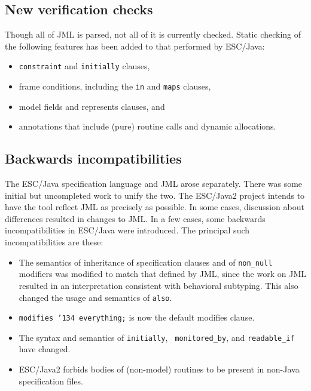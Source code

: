 \documentclass{acm_proc_article-sp}
\begin{document}
\subsection{New verification checks}
Though all of JML is parsed, not all of it is currently checked.
Static checking of the following features has been added to that performed by
ESC/Java: 
\setlength{\partopsep}{0in}\setlength{\parskip}{0in}\setlength{\itemsep}{0in}\setlength{\topsep}{0in}
\begin{itemize}
\setlength{\partopsep}{0in}\setlength{\parskip}{0in}\setlength{\itemsep}{0in}\setlength{\topsep}{0in}
\item \texttt{constraint} and \texttt{initially} clauses,
\item frame conditions, including the \texttt{in} and \texttt{maps} clauses,
\item model fields and represents clauses, and
\item annotations that include (pure) routine calls and dynamic allocations.
\end{itemize}

\subsection{Backwards incompatibilities}
The ESC/Java specification language and JML arose separately.  There
was some initial but uncompleted work to unify the two.  The ESC/Java2
project intends to have the tool reflect JML as precisely as possible.
In some cases, discussion about differences resulted in changes to JML.  In
a few cases, some backwards incompatibilities in ESC/Java were
introduced.  The principal such incompatibilities are these:
\setlength{\partopsep}{0in}\setlength{\parskip}{0in}\setlength{\itemsep}{0in}\setlength{\topsep}{0in}
\begin{itemize}
\setlength{\partopsep}{0in}\setlength{\parskip}{0in}\setlength{\itemsep}{0in}\setlength{\topsep}{0in}
\item The semantics of inheritance of specification clauses and of
  \texttt{non\_null} modifiers was modified to match that defined by JML, since
  the work on JML resulted in an interpretation consistent with
  behavioral subtyping.  This also changed the usage and semantics of \texttt{also}.
\item \texttt{modifies \char'134 everything;} is now the default modifies clause.
\item The syntax and semantics of \texttt{initially}, {\tt
    monitored\_by}, and \texttt{readable\_if} have changed.
\item ESC/Java2 
  forbids bodies of (non-model) routines to be present in non-Java
  specification files.
\end{itemize}
\end{document}
